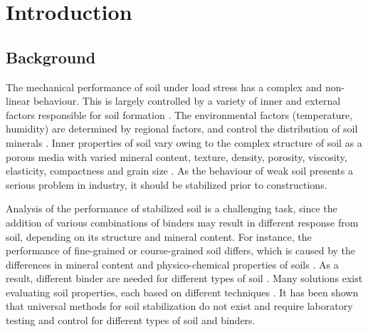 \documentclass[USenglish,twocolumn]{article}
\begin{document}



  
\maketitle

\section{Introduction}

\subsection{Background}

The mechanical performance of soil under load stress has a complex and non-linear behaviour. This is largely controlled by a variety of inner and external factors responsible for soil formation \cite{Jenny,Buol,Winterkorn1991a}. The environmental factors (temperature, humidity) are determined by regional factors, and control the distribution of soil minerals \cite{Righi1995,Nesse}. Inner properties of soil vary owing to the complex structure of soil as a porous media with varied mineral content, texture, density, porosity, viscosity, elasticity, compactness and grain size \cite{Kaellenetal2014,Kallenetal2016}. As the behaviour of weak soil presents a serious problem in industry, it should be stabilized prior to constructions. 

Analysis of the performance of stabilized soil is a challenging task, since the addition of various combinations of binders may result in different response from soil, depending on its structure and mineral content. For instance, the performance of fine-grained \cite{Mitchell} or course-grained soil \cite{Wangetal2009} differs, which is caused by the differences in mineral content and physico-chemical properties of soils \cite{Lambe}. As a result, different binder are needed for different types of soil \cite{Lindh2001,Guoetal2003}. Many solutions exist evaluating soil properties, each based on different techniques \cite{Lindh2004,Glendinning,Lindh202201,NIGITHA2022,Lemenkov2021c}. It has been shown that universal methods for soil stabilization do not exist and require laboratory testing and control for different types of soil and binders.
\end{document}
